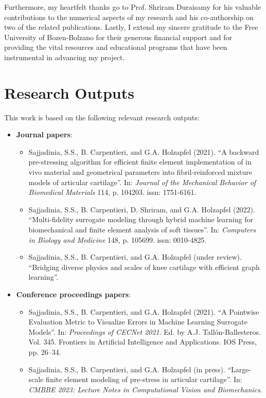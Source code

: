 \documentclass[12pt,a4paper]{report}
\begin{document}
Furthermore, my heartfelt thanks go to Prof. Shriram Duraisamy for his valuable contributions to the numerical aspects of my research and his co-authorship on two of the related publications. Lastly, I extend my sincere gratitude to the Free University of Bozen-Bolzano for their generous financial support and for providing the vital resources and educational programs that have been instrumental in advancing my project.

\chapter*{Research Outputs}
This work is based on the following relevant research outputs:
%
\begin{itemize}
\item \textbf{Journal papers}:
\begin{itemize}
    \item Sajjadinia, S.S., B. Carpentieri, and G.A. Holzapfel (2021). “A backward pre-stressing algorithm for efficient finite element implementation of in vivo material and geometrical parameters into fibril-reinforced mixture models of articular cartilage”. In: \textit{Journal of the Mechanical Behavior of Biomedical Materials} 114, p. 104203. issn: 1751-6161.
    \item Sajjadinia, S.S., B. Carpentieri, D. Shriram, and G.A. Holzapfel (2022). “Multi-fidelity surrogate modeling through hybrid machine learning for biomechanical and finite element analysis of soft tissues”. In: \textit{Computers in Biology and Medicine} 148, p. 105699. issn: 0010-4825.
    \item Sajjadinia, S.S., B. Carpentieri, and G.A. Holzapfel (under review). “Bridging diverse physics and scales of knee cartilage with efficient graph learning”.
\end{itemize}
\item \textbf{Conference proceedings papers}:
\begin{itemize}
    \item Sajjadinia, S.S., B. Carpentieri, and G.A. Holzapfel (2021). “A Pointwise Evaluation Metric to Visualize Errors in Machine Learning Surrogate Models”. In: \textit{Proceedings of CECNet 2021}. Ed. by A.J. Tall\'{o}n-Ballesteros. Vol. 345. Frontiers in Artificial Intelligence and Applications. IOS Press, pp. 26–34.
    \item Sajjadinia, S.S., B. Carpentieri, and G.A. Holzapfel (in press). “Large-scale finite element modeling of pre-stress in articular cartilage”. In: \textit{CMBBE 2023: Lecture Notes in Computational Vision and Biomechanics}.

\end{itemize}
\end{itemize}
\end{document}
